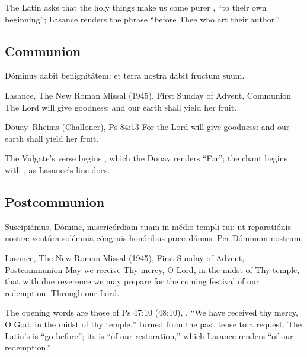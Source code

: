 \noindent The Latin asks that the holy things make us come purer , ``to their own beginning''; Lasance renders the phrase ``before
Thee who art their author.''

\subsection{Communion}
\label{proper-communion}


\begin{latinproper}
Dóminus dabit benignitátem: et terra nostra dabit fructum suum.
\end{latinproper}

\begin{englishwitness}{Lasance, The New Roman Missal (1945), First Sunday of Advent, Communion}
The Lord will give goodness: and our earth shall yield her fruit.
\end{englishwitness}

\begin{englishwitness}{Douay--Rheims (Challoner), Ps 84:13}
For the Lord will give goodness: and our earth shall yield her fruit.
\end{englishwitness}

\noindent The Vulgate's verse begins , which the Douay renders
``For''; the chant begins with , as Lasance's line does.

\subsection{Postcommunion}
\label{proper-postcommunion}


\begin{latinproper}
Suscipiámus, Dómine, misericórdiam tuam in médio templi tui: ut reparatiónis
nostræ ventúra solémnia cóngruis honóribus præcedámus. Per Dóminum nostrum.
\end{latinproper}

\begin{englishwitness}{Lasance, The New Roman Missal (1945), First Sunday of Advent, Postcommunion}
May we receive Thy mercy, O Lord, in the midst of Thy temple, that with due
reverence we may prepare for the coming festival of our redemption. Through
our Lord.
\end{englishwitness}

\noindent The opening words are those of Ps 47:10 (48:10), , ``We have received thy mercy,
O God, in the midst of thy temple,'' turned from the past tense to a request.
The Latin's  is ``go before''; its  is ``of our restoration,'' which Lasance renders ``of our redemption.''
